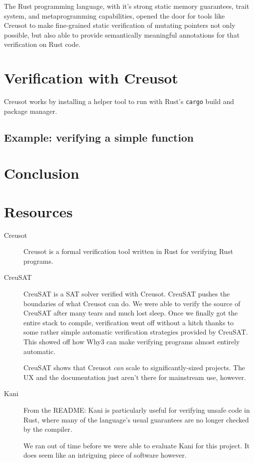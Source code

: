 \documentclass[12pt]{article}
\begin{document}
The Rust programming language, with it's strong static memory guarantees, trait system, and metaprogramming capabilities, 
opened the door for tools like Creusot to make fine-grained static verification of mutating pointers not only possible, but also able to provide 
semantically meaningful annotations for that verification on Rust code.   

\section{Verification with Creusot}

Creusot works by installing a helper tool to run with Rust's \texttt{cargo} build and package manager.


\subsection{Example: verifying a simple function}

\section{Conclusion}


\section{Resources}

\begin{description}
  \item[Creusot] \cite{denisCreusot2023} \cite{denisCreusotFoundryDeductive2022}

    Creusot is a formal verification tool written in Rust for verifying Rust programs.

  \item[CreuSAT] \cite{skotamCreuSAT2023}

    CreuSAT is a SAT solver verified with Creusot.
    CreuSAT pushes the boundaries of what Creusot can do.
    We were able to verify the source of CreuSAT after many tears and much lost sleep.
    Once we finally got the entire stack to compile, verification went off without a hitch thanks to some rather simple automatic verification strategies provided by CreuSAT.
    This showed off how Why3 can make verifying programs almost entirely automatic.

    CreuSAT shows that Creusot \emph{can} scale to significantly-sized projects.
    The UX and the documentation just aren't there for mainstream use, however.
    
  \item[Kani] \cite{Kani2023}

    From the README: Kani is particularly useful for verifying unsafe code in
    Rust, where many of the language's usual guarantees are no longer checked by
    the compiler.

    We ran out of time before we were able to evaluate Kani for this project.
    It does seem like an intriguing piece of software however.

\end{description}

\printbibliography
\end{document}
